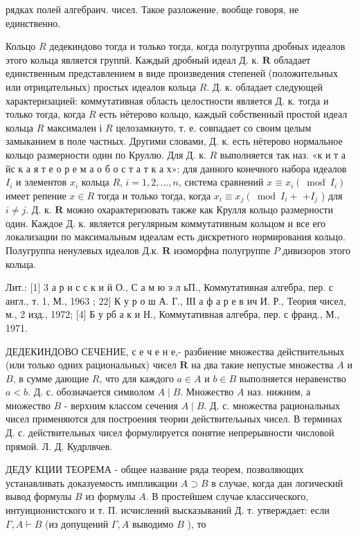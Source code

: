\documentclass[10pt]{article}
\begin{document}
рядках полей алгебраич. чисел. Такое разложение, вообще говоря, не единственно.



Кольцо $R$ дедекиндово тогда и только тогда, когда полугруппа дробных идеалов этого кольца является группй. Каждый дробный идеал Д. к. $\boldsymbol{R}$ обладает единственным представлением в виде произведения степеней (положительных или отрицательных) простых идеалов кольца $R$. Д. к. обладает следующей характеризацией: коммутативная область целостности является Д. к. тогда и только тогда, когда $R$ есть нётерово кольцо, каждый собственный простой идеал кольца $R$ максимален і $R$ целозамкнуто, т. е. совпадает со своим целым замыканием в поле частных. Другими словами, Д. к. есть нётерово нормальное кольцо размерности один по Круллю. Для Д. к. $R$ выполняется так наз. «к и т а йс к а я т е о р е м а о б о с т а т к а х»: для данного конечного набора идеалов $I_{i}$ и элементов $x_{i}$ кольца $R$, $i=1,2, \ldots, n$, система сравнений $x \equiv x_{i}\left(\bmod I_{i}\right)$ имеет репение $x \in R$ тогда и только тогда, когда $x_{i} \equiv x_{j}\left(\bmod I_{i}+\right.$ $+I_{j}$ ) для $i \neq j$. Д. к. $\boldsymbol{R}$ можно охарактеризовать также как Крулля кольцо размерности один. Каждое Д. к. является регулярным коммутативным кольцом и все его локализации по максимальным идеалам есть дискретного нормирования кольцо. Полугруппа ненулевых идеалов Д.к. $\boldsymbol{R}$ изоморфна полугруппе $P$ дивизоров этого кольца.



Лит.: [1] 3 а р и с с к и й О., С а м ю э л ьП., Коммутативная алгебра, пер. с англ., т. 1, М., 1963 ; 22] К у р о ш А. Г., ІІІ а ф а р е в ич И. Р., Теория чисел, м., 2 изд., 1972; [4] Б у рб а к и Н., Коммутативная алгебра, пер. с франд., М., 1971.



ДЕДЕКИНДОВО СЕЧЕНИЕ, с е ч е н е,- разбиение множества действительных (или только одних рациональных) чисел $\boldsymbol{R}$ на два такие непустые множества $A$ и $B$, в сумме дающие $R$, что для каждого $a \in A$ и $b \in B$ выполняется неравенство $a<b$. Д. с. обозначается символом $A \mid B$. Множество $A$ наз. нижним, а множество $B$ - верхним классом сечения $A \mid B$. Д. с. множества рациональных чисел применяются для построения теории действитељьных чисел. В терминах Д. с. действительных чисел формулируется понятие непрерывности числовой прямой. Л. Д. Кудрлвчев.



ДЕДУ КЦИИ ТЕОРЕМА - общее название ряда теорем, позволяющих устанавливать доказуемость импликации $A \supset B$ в случае, когда дан логический вывод формулы $B$ из формулы $A$. В простейшем случае классического, интуиционистского и т. П. исчислений высказываний Д. т. утверждает: если $\Gamma, A \vdash B$ (из допущений $\Gamma, A$ выводимо $B$ ), то
\end{document}
